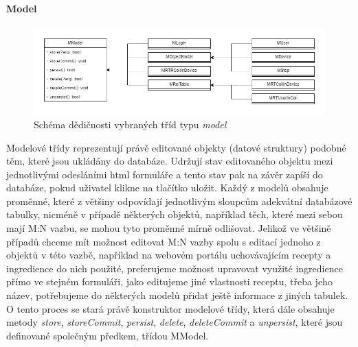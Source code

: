 \paragraph{Model} \hfill

\begin{figure}[h!]
    \centering
    \includegraphics[width=1\textwidth]{images/model-tridy.png}
    \caption{Schéma dědičnosti vybraných tříd typu \emph{model}}
    \label{viewClasses}
\end{figure}

Modelové třídy reprezentují právě editované objekty (datové struktury) podobné těm, které jsou ukládány do databáze. Udržují stav editovaného objektu mezi jednotlivými odesláními \acrshort{html} formuláře a tento stav pak na závěr zapíší do databáze, pokud uživatel klikne na tlačítko uložit. Každý z modelů obsahuje proměnné, které z většiny odpovídají jednotlivým sloupcům adekvátní databázové tabulky, nicméně v případě některých objektů, například těch, které mezi sebou mají M:N vazbu, se mohou tyto proměnné mírně odlišovat. Jelikož ve většině případů chceme mít možnost editovat M:N vazby spolu s editací jednoho z objektů v této vazbě, například na webovém portálu uchovávajícím recepty a ingredience do nich použité, preferujeme možnost upravovat využité ingredience přímo ve stejném formuláři, jako editujeme jiné vlastnosti receptu, třeba jeho název, potřebujeme do některých modelů přidat ještě informace z jiných tabulek. O tento proces se stará právě konstruktor modelové třídy, která dále obsahuje metody \emph{store}, \emph{storeCommit}, \emph{persist}, \emph{delete}, \emph{deleteCommit} a \emph{unpersist}, které jsou definované společným předkem, třídou MModel.

